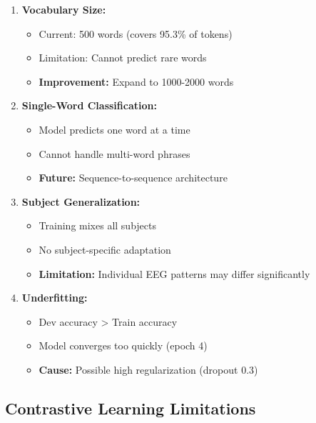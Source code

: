 \documentclass[12pt,a4paper]{article}
\begin{document}
\begin{enumerate}
    \item \textbf{Vocabulary Size:}
    \begin{itemize}
        \item Current: 500 words (covers 95.3\% of tokens)
        \item Limitation: Cannot predict rare words
        \item \textbf{Improvement:} Expand to 1000-2000 words
    \end{itemize}
    
    \item \textbf{Single-Word Classification:}
    \begin{itemize}
        \item Model predicts one word at a time
        \item Cannot handle multi-word phrases
        \item \textbf{Future:} Sequence-to-sequence architecture
    \end{itemize}
    
    \item \textbf{Subject Generalization:}
    \begin{itemize}
        \item Training mixes all subjects
        \item No subject-specific adaptation
        \item \textbf{Limitation:} Individual EEG patterns may differ significantly
    \end{itemize}
    
    \item \textbf{Underfitting:}
    \begin{itemize}
        \item Dev accuracy > Train accuracy
        \item Model converges too quickly (epoch 4)
        \item \textbf{Cause:} Possible high regularization (dropout 0.3)
    \end{itemize}
\end{enumerate}

\subsection{Contrastive Learning Limitations}
\end{document}
